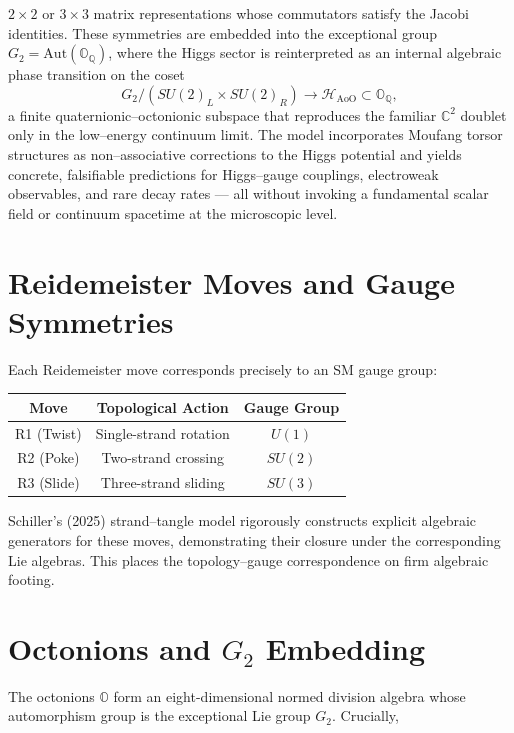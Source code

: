 \documentclass[12pt]{article}
\theoremstyle{remark}
\begin{document}
\(2\times 2\) or \(3\times 3\) matrix representations whose commutators satisfy the Jacobi identities.
These symmetries are embedded into the exceptional group \(G_2 = \mathrm{Aut}(\mathbb{O}_\mathbb{Q})\), 
where the Higgs sector is reinterpreted as an internal algebraic phase transition on the coset
\[
G_2 / (SU(2)_L \times SU(2)_R) \longrightarrow \mathcal{H}_\mathrm{AoO} \subset \mathbb{O}_\mathbb{Q},
\]
a finite quaternionic--octonionic subspace that reproduces the familiar \(\mathbb{C}^2\) doublet only in the low--energy continuum limit.  
The model incorporates Moufang torsor structures as non--associative corrections to the Higgs potential and yields concrete, falsifiable 
predictions for Higgs--gauge couplings, electroweak observables, and rare decay rates --- all without invoking a fundamental scalar field 
or continuum spacetime at the microscopic level.

\section{Reidemeister Moves and Gauge Symmetries}

Each Reidemeister move corresponds precisely to an SM gauge group:

\begin{center}
\begin{tabular}{|c|c|c|}
\hline
\textbf{Move} & \textbf{Topological Action} & \textbf{Gauge Group} \\
\hline
R1 (Twist) & Single-strand rotation & $U(1)$ \\
R2 (Poke) & Two-strand crossing      & $SU(2)$ \\
R3 (Slide) & Three-strand sliding     & $SU(3)$ \\
\hline
\end{tabular}
\end{center}

Schiller’s (2025) strand--tangle model rigorously constructs explicit algebraic generators for these moves, demonstrating their closure under the corresponding Lie algebras. This places the topology--gauge correspondence on firm algebraic footing.

\section{Octonions and $G_2$ Embedding}

The octonions $\mathbb{O}$ form an eight-dimensional normed division algebra whose automorphism group is the exceptional Lie group $G_2$. Crucially,
\end{document}

